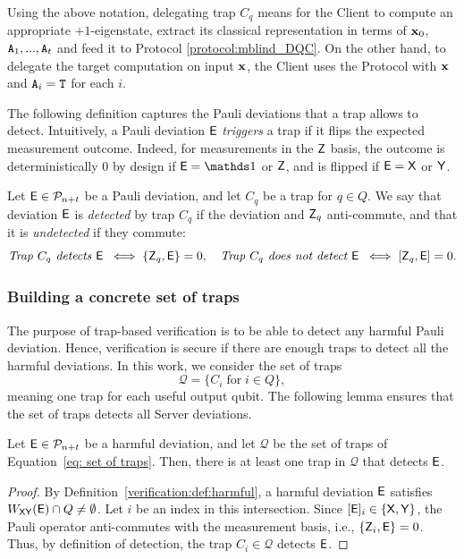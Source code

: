 Using the above notation, delegating trap $C_q$ means for the Client to compute an appropriate $+1$-eigenstate, extract its classical representation in terms of $\mathbf x_0$, $\mathtt{A}_1, ..., \mathtt{A}_t$ and feed it to Protocol \ref{protocol:mblind_DQC}. On the other hand, to delegate the target computation on input $\mathbf x$, the Client uses the Protocol with $\mathbf x$ and $\mathtt{A}_i=\mathtt{T}$ for each $i$.

The following definition captures the Pauli deviations that a trap allows to detect. Intuitively, a Pauli deviation $\mathsf{E}$ \emph{triggers} a trap if it flips the expected measurement outcome. Indeed, for measurements in the $\mathsf{Z}$ basis, the outcome is deterministically $0$ by design if $\E=\id$ or $\mathsf{Z}$, and is flipped if $\mathsf{E}=\mathsf{X}$ or $\mathsf{Y}$.

\begin{definition}
  Let $\mathsf{E}\in\mathcal{P}_{n+t}$ be a Pauli deviation, and let $C_q$ be a trap for $q\in Q$. We say that deviation $\mathsf{E}$ is \emph{detected} by trap $C_q$ if the deviation and $\mathsf{Z}_q$ anti-commute, and that it is \emph{undetected} if they commute:
  \begin{equation}
    \emph{Trap $C_q$ detects $\mathsf{E}$}\; \iff \{\mathsf{Z}_q, \mathsf{E}\} = 0,
    \quad
    \emph{Trap $C_q$ does not detect $\mathsf{E}$}\; \iff [\mathsf{Z}_q, \mathsf{E}] = 0.
  \end{equation}
\end{definition}

\subsubsection{Building a concrete set of traps}

The purpose of trap-based verification is to be able to detect any harmful Pauli deviation. Hence, verification is secure if there are enough traps to detect all the harmful deviations. In this work, we consider the set of traps
\begin{equation}
    \label{eq: set of traps}
    \mathcal Q = \{C_{i} \; \text{for}\; i\in Q\},
\end{equation}
meaning one trap for each useful output qubit.
The following lemma ensures that the set of traps detects all Server deviations.

\begin{lemma}
  \label{lemma:harmful deviations are detected}
  Let $\mathsf{E}\in\mathcal{P}_{n+t}$ be a harmful deviation, and let $\mathcal Q$ be the set of traps of Equation~\ref{eq: set of traps}. Then, there is at least one trap in $\mathcal Q$ that detects $\mathsf{E}$.
\end{lemma}
\begin{proof}
    By Definition~\ref{verification:def:harmful}, a harmful deviation $\mathsf{E}$ satisfies $W_{\mathsf{X}\mathsf{Y}}(\mathsf{E}) \cap Q \neq \emptyset$. Let $i$ be an index in this intersection. Since $[\mathsf{E}]_i \in \{\mathsf{X}, \mathsf{Y}\}$, the Pauli operator anti-commutes with the measurement basis, i.e., $\{\mathsf{Z}_i, \mathsf{E}\} = 0$. Thus, by definition of detection, the trap $C_i \in \mathcal{Q}$ detects $\mathsf{E}$.
\end{proof}

